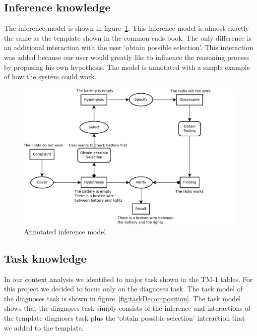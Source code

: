 \documentclass[a4paper,10pt]{article}
\begin{document}
\subsection{Inference knowledge}
The inference model is shown in figure~\ref{fig:InferenceModel}. This inference model is almost exactly the same as the template shown in the common cads book. The only difference is an additional interaction with the user `obtain possible selection'. This interaction was added because our user would greatly like to influence the reasoning process by proposing his own hypothesis. The model is annotated with a simple example of how the system could work.

\begin{figure}[htbp]
	\centering
		\includegraphics[width=1.00\textwidth]{InferenceModel.pdf}
	\caption{Annotated inference model}
	\label{fig:InferenceModel}
\end{figure}


\subsection{Task knowledge}
In our context analysis we identified to major task shown in the TM-1 tables. For this project we decided to focus only on the diagnoses task. The task model of the diagnoses task is shown in figure~\ref{fig:taskDecomposition}. The task model shows that the diagnoses task simply consists of the inference and interactions of the template diagnoses task plus the `obtain possible selection' interaction that we added to the template.
\end{document}
